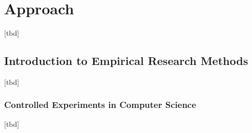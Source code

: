 \chapter{Approach}
\label{chapter:approach}

[tbd]











\section{Introduction to Empirical Research Methods}

[tbd]















\subsection{Controlled Experiments in Computer Science}

[tbd]


